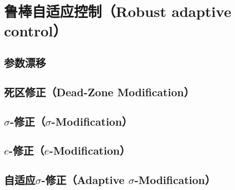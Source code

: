 \section{鲁棒自适应控制（Robust adaptive control）}\label{4Eref}
\subsection{参数漂移}
\subsection{死区修正（Dead-Zone Modification）}
\subsection{\texorpdfstring{$\sigma$-修正（$\sigma$-Modification）}{σ-修正（σ-Modification）}}
\subsection{\texorpdfstring{$e$-修正（$e$-Modification）}{e-修正（e-Modification）}}
\subsection{\texorpdfstring{自适应$\sigma$-修正（Adaptive $\sigma$-Modification）}{自适应σ-修正（Adaptive σ-Modification）}}